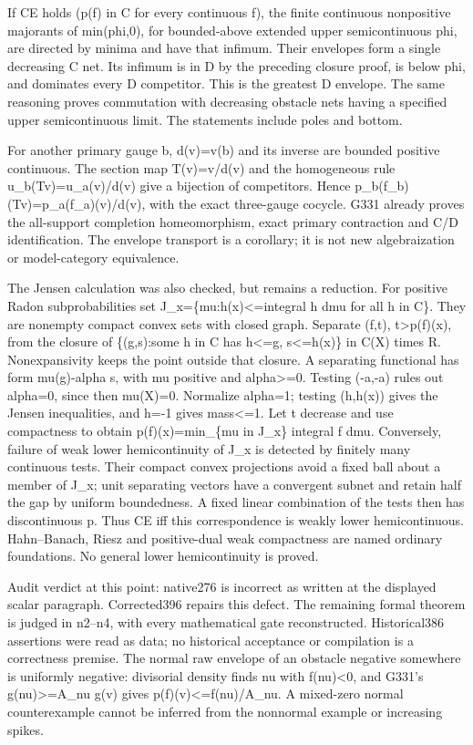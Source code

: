 \documentclass[11pt]{article}
\begin{document}
If CE holds (p(f) in C for every continuous f), the finite continuous nonpositive majorants of min(phi,0), for bounded-above extended upper semicontinuous phi, are directed by minima and have that infimum. Their envelopes form a single decreasing C net. Its infimum is in D by the preceding closure proof, is below phi, and dominates every D competitor. This is the greatest D envelope. The same reasoning proves commutation with decreasing obstacle nets having a specified upper semicontinuous limit. The statements include poles and bottom.

For another primary gauge b, d(v)=v(b) and its inverse are bounded positive continuous. The section map T(v)=v/d(v) and the homogeneous rule u\_b(Tv)=u\_a(v)/d(v) give a bijection of competitors. Hence p\_b(f\_b)(Tv)=p\_a(f\_a)(v)/d(v), with the exact three-gauge cocycle. G331 already proves the all-support completion homeomorphism, exact primary contraction and C/D identification. The envelope transport is a corollary; it is not new algebraization or model-category equivalence.

The Jensen calculation was also checked, but remains a reduction. For positive Radon subprobabilities set J\_x=\{mu:h(x)<=integral h dmu for all h in C\}. They are nonempty compact convex sets with closed graph. Separate (f,t), t>p(f)(x), from the closure of \{(g,s):some h in C has h<=g, s<=h(x)\} in C(X) times R. Nonexpansivity keeps the point outside that closure. A separating functional has form mu(g)-alpha s, with mu positive and alpha>=0. Testing (-a,-a) rules out alpha=0, since then mu(X)=0. Normalize alpha=1; testing (h,h(x)) gives the Jensen inequalities, and h=-1 gives mass<=1. Let t decrease and use compactness to obtain p(f)(x)=min\_\{mu in J\_x\} integral f dmu. Conversely, failure of weak lower hemicontinuity of J\_x is detected by finitely many continuous tests. Their compact convex projections avoid a fixed ball about a member of J\_x; unit separating vectors have a convergent subnet and retain half the gap by uniform boundedness. A fixed linear combination of the tests then has discontinuous p. Thus CE iff this correspondence is weakly lower hemicontinuous. Hahn--Banach, Riesz and positive-dual weak compactness are named ordinary foundations. No general lower hemicontinuity is proved.

Audit verdict at this point: native276 is incorrect as written at the displayed scalar paragraph. Corrected396 repairs this defect. The remaining formal theorem is judged in n2--n4, with every mathematical gate reconstructed. Historical386 assertions were read as data; no historical acceptance or compilation is a correctness premise. The normal raw envelope of an obstacle negative somewhere is uniformly negative: divisorial density finds nu with f(nu)<0, and G331's g(nu)>=A\_nu g(v) gives p(f)(v)<=f(nu)/A\_nu. A mixed-zero normal counterexample cannot be inferred from the nonnormal example or increasing spikes.
\end{document}
